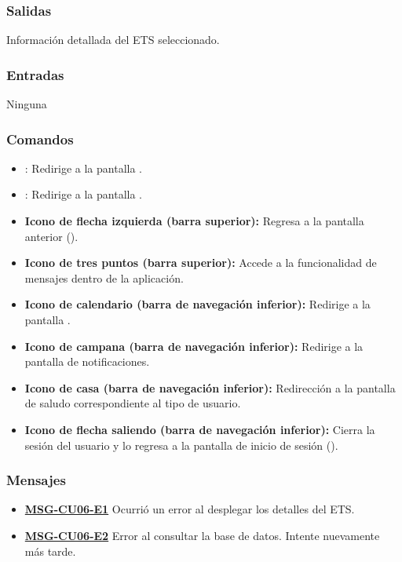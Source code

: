 \subsubsection{Salidas}
Información detallada del ETS seleccionado.

\subsubsection{Entradas}
Ninguna

\subsubsection{Comandos}
\begin{itemize}
	\item {}: Redirige a la pantalla .
	\item {}: Redirige a la pantalla .
	\item \textbf{Icono de flecha izquierda (barra superior):} Regresa a la pantalla anterior ().
	\item \textbf{Icono de tres puntos (barra superior):} Accede a la funcionalidad de mensajes dentro de la aplicación.
	\item \textbf{Icono de calendario (barra de navegación inferior):} Redirige a la pantalla .
	\item \textbf{Icono de campana (barra de navegación inferior):} Redirige a la pantalla de notificaciones.
	\item \textbf{Icono de casa (barra de navegación inferior):} Redirección a la pantalla de saludo correspondiente al tipo de usuario.
	\item \textbf{Icono de flecha saliendo (barra de navegación inferior):} Cierra la sesión del usuario y lo regresa a la pantalla de inicio de sesión ().
\end{itemize}

\subsubsection{Mensajes}
\begin{itemize}
	\item \textbf{\hyperref[msg:CU06-E1]{MSG-CU06-E1}} Ocurrió un error al desplegar los detalles del ETS.
	\item \textbf{\hyperref[msg:CU06-E2]{MSG-CU06-E2}} Error al consultar la base de datos. Intente nuevamente más tarde.
\end{itemize}

